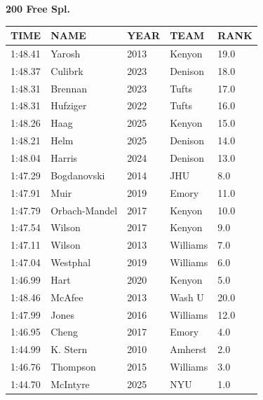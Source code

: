 \begin{table}[H]
\centering
\begin{minipage}[t]{0.6\textwidth}
\centering
\textbf{200 Free Spl.}\\[0.1cm]
\begin{tabular}{@{}p{1.8cm}p{2.8cm}p{1.2cm}p{1.4cm}p{0.8cm}@{}}
\hline
    \textbf{TIME} & \textbf{NAME} & \textbf{YEAR} & \textbf{TEAM} & \textbf{RANK} \\
\hline
    1:48.41 & Yarosh & 2013 & Kenyon & 19.0 \\
    1:48.37 & Culibrk & 2023 & Denison & 18.0 \\
    1:48.31 & Brennan & 2023 & Tufts & 17.0 \\
    1:48.31 & Hufziger & 2022 & Tufts & 16.0 \\
    1:48.26 & Haag & 2025 & Kenyon & 15.0 \\
    1:48.21 & Helm & 2025 & Denison & 14.0 \\
    1:48.04 & Harris & 2024 & Denison & 13.0 \\
    1:47.29 & Bogdanovski & 2014 & JHU & 8.0 \\
    1:47.91 & Muir & 2019 & Emory & 11.0 \\
    1:47.79 & Orbach-Mandel & 2017 & Kenyon & 10.0 \\
    1:47.54 & Wilson & 2017 & Kenyon & 9.0 \\
    1:47.11 & Wilson & 2013 & Williams & 7.0 \\
    1:47.04 & Westphal & 2019 & Williams & 6.0 \\
    1:46.99 & Hart & 2020 & Kenyon & 5.0 \\
    1:48.46 & McAfee & 2013 & Wash U & 20.0 \\
    1:47.99 & Jones & 2016 & Williams & 12.0 \\
    1:46.95 & Cheng & 2017 & Emory & 4.0 \\
    1:44.99 & K. Stern & 2010 & Amherst & 2.0 \\
    1:46.76 & Thompson & 2015 & Williams & 3.0 \\
    1:44.70 & McIntyre & 2025 & NYU & 1.0 \\
\hline
\end{tabular}
\end{minipage}
\end{table}

